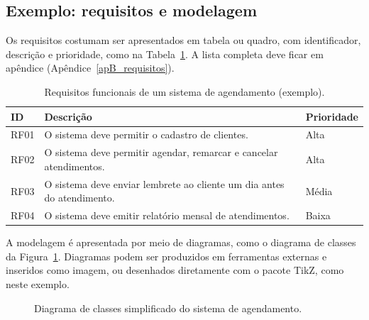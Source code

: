 \subsection{Exemplo: requisitos e modelagem}

Os requisitos costumam ser apresentados em tabela ou quadro, com identificador, descrição e prioridade, como na Tabela~\ref{tab_requisitos}. A lista completa deve ficar em apêndice (Apêndice~\ref{apB_requisitos}).

\begin{table}[htb]
	\centering
	\caption{Requisitos funcionais de um sistema de agendamento (exemplo).}
	\label{tab_requisitos}
	\small
	\begin{tabularx}{\textwidth}{lXl}
		\toprule
		ID & Descrição & Prioridade \\
		\midrule
		RF01 & O sistema deve permitir o cadastro de clientes. & Alta \\
		RF02 & O sistema deve permitir agendar, remarcar e cancelar atendimentos. & Alta \\
		RF03 & O sistema deve enviar lembrete ao cliente um dia antes do atendimento. & Média \\
		RF04 & O sistema deve emitir relatório mensal de atendimentos. & Baixa \\
		\bottomrule
	\end{tabularx}
\end{table}

A modelagem é apresentada por meio de diagramas, como o diagrama de classes da Figura~\ref{fig_classes}. Diagramas podem ser produzidos em ferramentas externas e inseridos como imagem, ou desenhados diretamente com o pacote TikZ, como neste exemplo.

\begin{figure}[htb]
	\centering
	\caption{Diagrama de classes simplificado do sistema de agendamento.}
	\label{fig_classes}
\end{figure}

